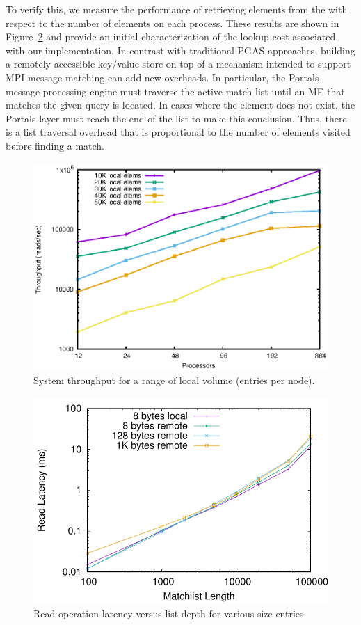 To verify this, we measure the performance of retrieving elements from
the \pdht with respect to the number of elements on each process.
These results are shown in Figure~\ref{fig:mlen} and provide an
initial characterization of the lookup cost associated with our \pdht
implementation.  In contrast with traditional PGAS approaches,
building a remotely accessible key/value store on top of a mechanism
intended to support MPI message matching can add new overheads.  In
particular, the Portals message processing engine must traverse the
active match list until an ME that matches the given query is located.
In cases where the element does not exist, the Portals layer must
reach the end of the list to make this conclusion.  Thus, there is a
list traversal overhead that is proportional to the number of elements
visited before finding a match.

\begin{figure}
    \centering
    \includegraphics[width=.9\linewidth]{plots/throughput}
    \caption{System throughput for a range of local volume (entries per node).}
    \label{fig:throughput}
\end{figure}

\begin{figure}
    \centering
    \includegraphics[width=.95\linewidth]{plots/mlen}
    \caption{Read operation latency versus list depth for various size entries.}
    \label{fig:mlen}
\end{figure}

